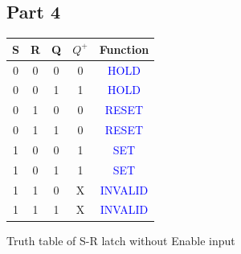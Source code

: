 \documentclass[pdftex,12pt,a4paper]{article}
\theoremstyle{plain}
\begin{document}
\subsection{Part 4}
\begin{center}
\begin{tabular}{c c c | c c}
S & R & Q & $Q^+$ & Function\\
\hline 
0 & 0 & 0 & 0 & \textcolor{blue}{HOLD}\\
0 & 0 & 1 & 1 & \textcolor{blue}{HOLD}\\
0 & 1 & 0 & 0 & \textcolor{blue}{RESET}\\
0 & 1 & 1 & 0 & \textcolor{blue}{RESET}\\
1 & 0 & 0 & 1 & \textcolor{blue}{SET}\\
1 & 0 & 1 & 1 & \textcolor{blue}{SET}\\
1 & 1 & 0 & X & \textcolor{blue}{INVALID}\\
1 & 1 & 1 & X & \textcolor{blue}{INVALID}\\
\end{tabular}\par\vspace{1em}
 Truth table of S-R latch without Enable input
\end{center}
\end{document}
